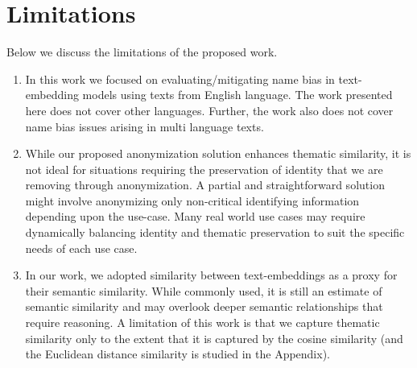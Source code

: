 \section{Limitations}
Below we discuss the limitations of the proposed work.
\begin{enumerate}
    \item In this work we focused on evaluating/mitigating name bias in text-embedding models using texts from English language. The work presented here does not cover other languages. Further, the work also does not cover name bias issues arising in multi language texts.
    

    \item While our proposed anonymization solution enhances thematic similarity, it is not ideal for situations requiring the preservation of identity that we are removing through anonymization.   A partial and straightforward solution might involve anonymizing only non-critical identifying information depending upon the use-case.  Many real world use cases may require dynamically balancing identity and thematic preservation to suit the specific needs of each use case.

    \item In our work, we adopted similarity between text-embeddings as a proxy for their semantic similarity. While commonly used, it is still an estimate of semantic similarity and may overlook deeper semantic relationships that require reasoning. A limitation of this work is that we capture thematic similarity only to the extent that it is captured by the cosine similarity (and the Euclidean distance similarity is studied in the Appendix).
   

\end{enumerate}